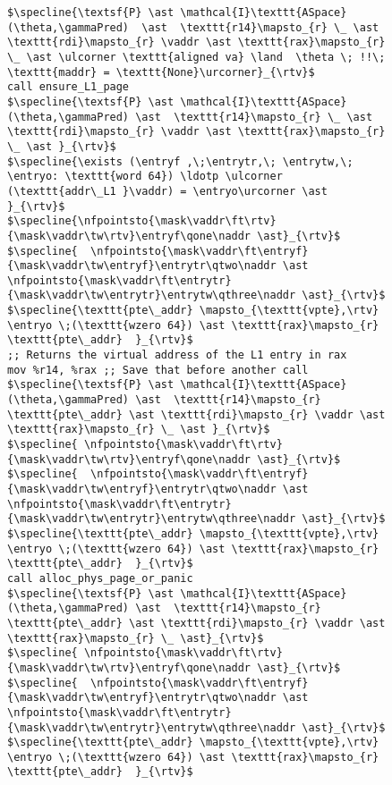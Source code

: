 \begin{figure}\footnotesize
  \begin{lstlisting}
$\specline{\textsf{P} \ast \mathcal{I}\texttt{ASpace}(\theta,\gammaPred)  \ast  \texttt{r14}\mapsto_{r} \_ \ast \texttt{rdi}\mapsto_{r} \vaddr \ast \texttt{rax}\mapsto_{r} \_ \ast \ulcorner \texttt{aligned va} \land  \theta \; !!\; \texttt{maddr} = \texttt{None}\urcorner}_{\rtv}$
call ensure_L1_page
$\specline{\textsf{P} \ast \mathcal{I}\texttt{ASpace}(\theta,\gammaPred) \ast  \texttt{r14}\mapsto_{r} \_ \ast \texttt{rdi}\mapsto_{r} \vaddr \ast \texttt{rax}\mapsto_{r} \_ \ast }_{\rtv}$
$\specline{\exists (\entryf ,\;\entrytr,\; \entrytw,\; \entryo: \texttt{word 64}) \ldotp \ulcorner (\texttt{addr\_L1 }\vaddr) = \entryo\urcorner \ast }_{\rtv}$
$\specline{\nfpointsto{\mask\vaddr\ft\rtv}{\mask\vaddr\tw\rtv}\entryf\qone\naddr \ast}_{\rtv}$ 
$\specline{  \nfpointsto{\mask\vaddr\ft\entryf}{\mask\vaddr\tw\entryf}\entrytr\qtwo\naddr \ast \nfpointsto{\mask\vaddr\ft\entrytr}{\mask\vaddr\tw\entrytr}\entrytw\qthree\naddr \ast}_{\rtv}$
$\specline{\texttt{pte\_addr} \mapsto_{\texttt{vpte},\rtv} \entryo \;(\texttt{wzero 64}) \ast \texttt{rax}\mapsto_{r} \texttt{pte\_addr}  }_{\rtv}$
;; Returns the virtual address of the L1 entry in rax
mov %r14, %rax ;; Save that before another call
$\specline{\textsf{P} \ast \mathcal{I}\texttt{ASpace}(\theta,\gammaPred) \ast  \texttt{r14}\mapsto_{r} \texttt{pte\_addr} \ast \texttt{rdi}\mapsto_{r} \vaddr \ast \texttt{rax}\mapsto_{r} \_ \ast }_{\rtv}$
$\specline{ \nfpointsto{\mask\vaddr\ft\rtv}{\mask\vaddr\tw\rtv}\entryf\qone\naddr \ast}_{\rtv}$ 
$\specline{  \nfpointsto{\mask\vaddr\ft\entryf}{\mask\vaddr\tw\entryf}\entrytr\qtwo\naddr \ast \nfpointsto{\mask\vaddr\ft\entrytr}{\mask\vaddr\tw\entrytr}\entrytw\qthree\naddr \ast}_{\rtv}$
$\specline{\texttt{pte\_addr} \mapsto_{\texttt{vpte},\rtv} \entryo \;(\texttt{wzero 64}) \ast \texttt{rax}\mapsto_{r} \texttt{pte\_addr}  }_{\rtv}$
call alloc_phys_page_or_panic
$\specline{\textsf{P} \ast \mathcal{I}\texttt{ASpace}(\theta,\gammaPred) \ast  \texttt{r14}\mapsto_{r} \texttt{pte\_addr} \ast \texttt{rdi}\mapsto_{r} \vaddr \ast \texttt{rax}\mapsto_{r} \_ \ast}_{\rtv}$
$\specline{ \nfpointsto{\mask\vaddr\ft\rtv}{\mask\vaddr\tw\rtv}\entryf\qone\naddr \ast}_{\rtv}$ 
$\specline{  \nfpointsto{\mask\vaddr\ft\entryf}{\mask\vaddr\tw\entryf}\entrytr\qtwo\naddr \ast \nfpointsto{\mask\vaddr\ft\entrytr}{\mask\vaddr\tw\entrytr}\entrytw\qthree\naddr \ast}_{\rtv}$
$\specline{\texttt{pte\_addr} \mapsto_{\texttt{vpte},\rtv} \entryo \;(\texttt{wzero 64}) \ast \texttt{rax}\mapsto_{r} \texttt{pte\_addr}  }_{\rtv}$

\end{lstlisting}
\end{figure}
